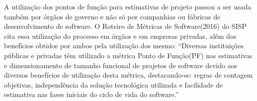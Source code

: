 A utilização dos pontos de função para estimativas de projeto passou a ser usada também por órgãos de governo e não só por companhias ou fábricas de desenvolvimento de software. O Roteiro de Métricas de Software(2016) do SISP cita essa utilização do processo em órgãos e em empresas privadas, além dos benefícios obtidos por ambos pela utilização dos mesmo:  “Diversas instituições públicas e privadas têm utilizado a métrica Ponto de Função(PF) nas estimativas e dimensionamento de tamanho funcional de projetos de software devido aos diversos benefícios de utilização desta métrica, destacando-se: regras de contagem objetivas, independência da solução tecnológica utilizada e facilidade de estimativa nas fases iniciais do ciclo de vida do software.” \cite{SISP:2016}
